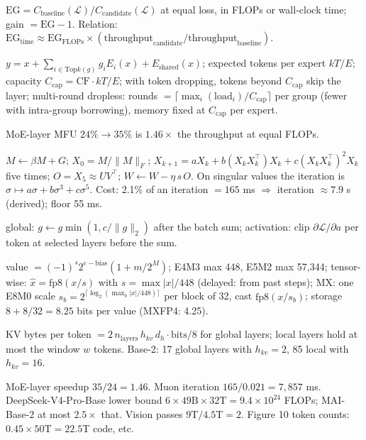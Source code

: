 \documentclass[11pt,letterpaper]{article}
\begin{document}
\begin{description}[leftmargin=0pt,labelindent=0pt,itemsep=6pt,font=\normalfont\bfseries\sffamily]
\item[Efficiency gain.] $\text{EG}=C_{\text{baseline}}(\mathcal{L})/C_{\text{candidate}}(\mathcal{L})$ at equal loss, in FLOPs or wall-clock time; gain $=\text{EG}-1$. Relation: $\text{EG}_{\text{time}}\approx\text{EG}_{\text{FLOPs}}\times(\text{throughput}_{\text{candidate}}/\text{throughput}_{\text{baseline}})$.
\item[MoE layer.] $y=x+\sum_{i\in\mathrm{Top}k(g)}g_iE_i(x)+E_{\text{shared}}(x)$; expected tokens per expert $kT/E$; capacity $C_{\text{cap}}=\text{CF}\cdot kT/E$; with token dropping, tokens beyond $C_{\text{cap}}$ skip the layer; multi-round dropless: rounds $=\lceil\max_i(\text{load}_i)/C_{\text{cap}}\rceil$ per group (fewer with intra-group borrowing), memory fixed at $C_{\text{cap}}$ per expert.
\item[MoE throughput.] MoE-layer MFU $24\%\to35\%$ is $1.46\times$ the throughput at equal FLOPs.
\item[Muon.] $M\leftarrow\beta M+G$; $X_0=M/\|M\|_F$; $X_{k+1}=aX_k+b(X_kX_k^{\top})X_k+c(X_kX_k^{\top})^2X_k$ five times; $O=X_5\approx UV^{\top}$; $W\leftarrow W-\eta\,s\,O$. On singular values the iteration is $\sigma\mapsto a\sigma+b\sigma^3+c\sigma^5$. Cost: 2.1\% of an iteration $=165$ ms $\Rightarrow$ iteration $\approx7.9$ s (derived); floor 55 ms.
\item[Gradient clipping.] global: $g\leftarrow g\min(1,c/\|g\|_2)$ after the batch sum; activation: clip $\partial\mathcal{L}/\partial a$ per token at selected layers before the sum.
\item[FP8 and MXFP8.] value $=(-1)^s2^{e-\text{bias}}(1+m/2^{M})$; E4M3 max 448, E5M2 max 57,344; tensor-wise: $\hat x=\text{fp8}(x/s)$ with $s=\max|x|/448$ (delayed: from past steps); MX: one E8M0 scale $s_b=2^{\lceil\log_2(\max_b|x|/448)\rceil}$ per block of 32, cast $\text{fp8}(x/s_b)$; storage $8+8/32=8.25$ bits per value (MXFP4: 4.25).
\item[Attention cache.] KV bytes per token $=2\,n_{\text{layers}}\,h_{kv}\,d_h\cdot\text{bits}/8$ for global layers; local layers hold at most the window $w$ tokens. Base-2: 17 global layers with $h_{kv}=2$, 85 local with $h_{kv}=16$.
\item[Worked numbers (derived).] MoE-layer speedup $35/24=1.46$. Muon iteration $165/0.021=7{,}857$ ms. DeepSeek-V4-Pro-Base lower bound $6\times49\text{B}\times32\text{T}=9.4\times10^{24}$ FLOPs; MAI-Base-2 at most $2.5\times$ that. Vision passes $9\text{T}/4.5\text{T}=2$. Figure 10 token counts: $0.45\times50\text{T}=22.5$T code, etc.
\end{description}
\end{document}

